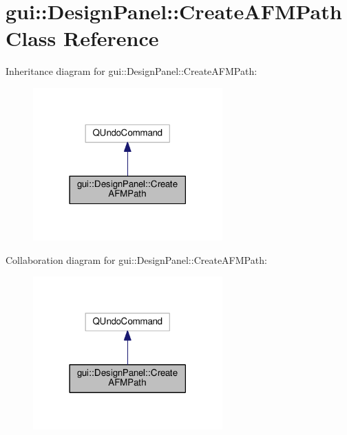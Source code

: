 \hypertarget{classgui_1_1DesignPanel_1_1CreateAFMPath}{}\section{gui\+:\+:Design\+Panel\+:\+:Create\+A\+F\+M\+Path Class Reference}
\label{classgui_1_1DesignPanel_1_1CreateAFMPath}


Inheritance diagram for gui\+:\+:Design\+Panel\+:\+:Create\+A\+F\+M\+Path\+:\nopagebreak
\begin{figure}[H]
\begin{center}
\leavevmode
\includegraphics[width=206pt]{classgui_1_1DesignPanel_1_1CreateAFMPath__inherit__graph}
\end{center}
\end{figure}


Collaboration diagram for gui\+:\+:Design\+Panel\+:\+:Create\+A\+F\+M\+Path\+:\nopagebreak
\begin{figure}[H]
\begin{center}
\leavevmode
\includegraphics[width=206pt]{classgui_1_1DesignPanel_1_1CreateAFMPath__coll__graph}
\end{center}
\end{figure}
